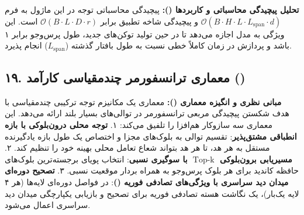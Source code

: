 \textbf{تحلیل پیچیدگی محاسباتی و کاربردها ():}
پیچیدگی محاسباتی توجه در این ماژول به فرم $\mathcal{O}(B \cdot H \cdot L \cdot L_{\text{span}} \cdot d)$ و پیچیدگی شاخه تطبیق برابر $\mathcal{O}(B \cdot L \cdot D \cdot r)$ است. این ویژگی به مدل اجازه می‌دهد تا در حین تولید توکن‌های جدید، طول پرس‌وجو برابر ۱ باشد و پردازش در زمان کاملاً خطی نسبت به طول بافتار گذشته ($L_{\text{span}}$) انجام پذیرد.



\subsection*{۱۹. معماری ترانسفورمر چندمقیاسی کارآمد  ()}

\textbf{مبانی نظری و انگیزه معماری ():}
معماری  یک مکانیزم توجه ترکیبی چندمقیاسی با هدف شکستن پیچیدگی مربعی ترانسفورمر در توالی‌های بسیار بلند ارائه می‌دهد. این معماری سه سازوکار هم‌افزا را تلفیق می‌کند:
۱. \textbf{توجه محلی درون‌بلوکی با بازه انطباقی مشتق‌پذیر}: تقسیم توالی به بلوک‌های مجزا و اختصاص یک طول بازه یادگیرنده مستقل به هر هد، تا هر هد بتواند شعاع تعامل محلی بهینه خود را تنظیم کند.
۲. \textbf{مسیریابی برون‌بلوکی $\operatorname{Top-k}$ با سوگیری نسبی}: انتخاب پویای برجسته‌ترین بلوک‌های حافظه کاندید برای هر بلوک پرس‌وجو به همراه بردار موقعیت نسبی.
۳. \textbf{تصحیح دوره‌ای میدان دید سراسری با ویژگی‌های تصادفی فوریه ()}: در فواصل دوره‌ای لایه‌ها (هر ۴ لایه یک‌بار)، یک نگاشت هسته تصادفی فوریه برای تصحیح و بازیابی یکپارچگی میدان دید سراسری اعمال می‌شود.

